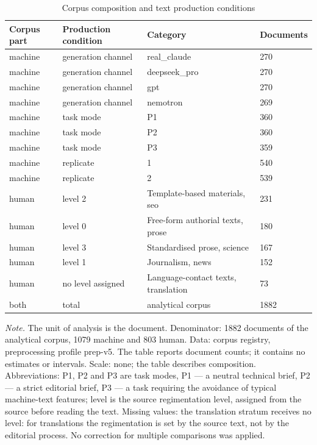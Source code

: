 \begin{table}[htbp]
\centering
\small
\caption{Corpus composition and text production conditions}
\label{tab:1}
\begin{tabular}{llll}
\toprule
Corpus part & Production condition & Category & Documents \\
\midrule
machine & generation channel & real\_claude & 270 \\
machine & generation channel & deepseek\_pro & 270 \\
machine & generation channel & gpt & 270 \\
machine & generation channel & nemotron & 269 \\
machine & task mode & P1 & 360 \\
machine & task mode & P2 & 360 \\
machine & task mode & P3 & 359 \\
machine & replicate & 1 & 540 \\
machine & replicate & 2 & 539 \\
human & level 2 & Template-based materials, seo & 231 \\
human & level 0 & Free-form authorial texts, prose & 180 \\
human & level 3 & Standardised prose, science & 167 \\
human & level 1 & Journalism, news & 152 \\
human & no level assigned & Language-contact texts, translation & 73 \\
both & total & analytical corpus & 1882 \\
\bottomrule
\end{tabular}
\begin{minipage}{\linewidth}\footnotesize\vspace{2pt}
\textit{Note.} The unit of analysis is the document. Denominator: 1882 documents of the analytical corpus, 1079 machine and 803 human. Data: corpus registry, preprocessing profile prep-v5. The table reports document counts; it contains no estimates or intervals. Scale: none; the table describes composition. Abbreviations: P1, P2 and P3 are task modes, P1 — a neutral technical brief, P2 — a strict editorial brief, P3 — a task requiring the avoidance of typical machine-text features; level is the source regimentation level, assigned from the source before reading the text. Missing values: the translation stratum receives no level: for translations the regimentation is set by the source text, not by the editorial process. No correction for multiple comparisons was applied.
\end{minipage}
\end{table}
